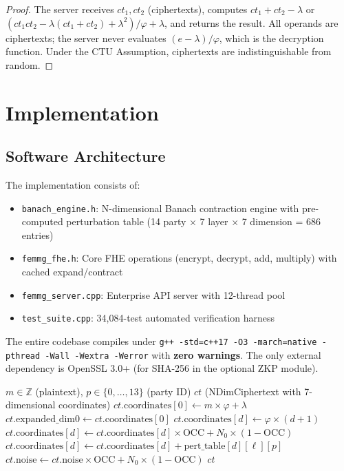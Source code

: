 \documentclass[11pt,a4paper]{article}
\begin{document}
\begin{proof}
The server receives $ct_1, ct_2$ (ciphertexts), computes $ct_1 + ct_2 - \lambda$ or $(ct_1 ct_2 - \lambda(ct_1 + ct_2) + \lambda^2)/\varphi + \lambda$, and returns the result. All operands are ciphertexts; the server never evaluates $(e - \lambda)/\varphi$, which is the decryption function. Under the CTU Assumption, ciphertexts are indistinguishable from random.
\end{proof}

\section{Implementation}
\label{sec:impl}

\subsection{Software Architecture}

The implementation consists of:
\begin{itemize}
    \item \texttt{banach\_engine.h}: N-dimensional Banach contraction engine with pre-computed perturbation table (14 party $\times$ 7 layer $\times$ 7 dimension = 686 entries)
    \item \texttt{femmg\_fhe.h}: Core FHE operations (encrypt, decrypt, add, multiply) with cached expand/contract
    \item \texttt{femmg\_server.cpp}: Enterprise API server with 12-thread pool
    \item \texttt{test\_suite.cpp}: 34,084-test automated verification harness
\end{itemize}

The entire codebase compiles under \texttt{g++ -std=c++17 -O3 -march=native -pthread -Wall -Wextra -Werror} with \textbf{zero warnings}. The only external dependency is OpenSSL 3.0+ (for SHA-256 in the optional ZKP module).

\begin{algorithm}
\caption{Encryption: 7D Banach Forward Pass}
\label{alg:encrypt}
\begin{algorithmic}[1]
\Require $m \in \mathbb{Z}$ (plaintext), $p \in \{0,\ldots,13\}$ (party ID)
\Ensure $ct$ (NDimCiphertext with 7-dimensional coordinates)
\State $ct.\text{coordinates}[0] \gets m \times \varphi + \lambda$
\State $ct.\text{expanded\_dim0} \gets ct.\text{coordinates}[0]$ 
    \State $ct.\text{coordinates}[d] \gets \varphi \times (d+1)$
\EndFor
{} 
     
        \State $ct.\text{coordinates}[d] \gets ct.\text{coordinates}[d] \times \text{OCC} + N_0 \times (1 - \text{OCC})$
        \State $ct.\text{coordinates}[d] \gets ct.\text{coordinates}[d] + \text{pert\_table}[d][\ell][p]$
    \EndFor
    \State $ct.\text{noise} \gets ct.\text{noise} \times \text{OCC} + N_0 \times (1 - \text{OCC})$
\EndFor
\State \Return $ct$
\end{algorithmic}
\end{algorithm}
\end{document}
